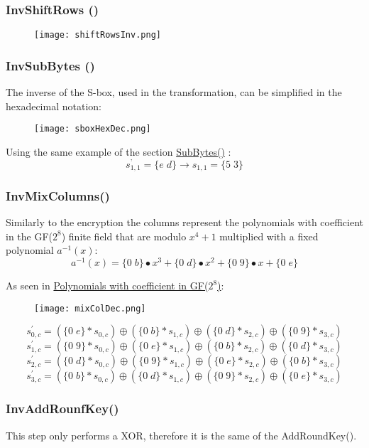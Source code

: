 \documentclass{article}
\begin{document}
\subsubsection{InvShiftRows ()}
\begin{figure}[htb]
	\begin{center}
  		\texttt{[image: shiftRowsInv.png]} 
 	\end{center}
\end{figure}

\subsubsection{InvSubBytes ()}
The inverse of the S-box, used in the transformation, can be simplified in the hexadecimal notation:
\begin{figure}[htb]
	\begin{center}
  		\texttt{[image: sboxHexDec.png]} 
 	\end{center}
\end{figure}
Using the same example of the section \hyperref[sec:sboxEnc]{SubBytes()} :
\[s^{’}_{1,1}=\{e\;d\} \longrightarrow s_{1,1}=\{5\; 3\}\]

\subsubsection{InvMixColumns()}
Similarly to the encryption the columns represent the polynomials with coefficient in the GF($2^8$) finite field that are modulo $x^4+1$ multiplied  with a fixed polynomial $a^{-1}(x)$:
\[a^{-1}(x) = \{0\;b\}•x^3 + \{0\;d\}•x^2+ \{0\;9\}•x + \{0\;e\}\]

As seen in \hyperref[sec:polyGF]{Polynomials with coefficient in GF($2^8$)}:
\begin{figure}[htb]
	\begin{center}
  		\texttt{[image: mixColDec.png]} 
 	\end{center}
\end{figure}

\[s^{'}_{0,c}= (\{0\;e\} * s_{0,c}) \oplus (\{0\;b\} * s_{1,c}) \oplus (\{0\;d\} * s_{2,c})\oplus  (\{0\;9\} * s_{3,c})\]
\[s^{'}_{1,c}= (\{0\;9\} * s_{0,c}) \oplus  (\{0\;e\} * s_{1,c})\oplus (\{0\;b\} * s_{2,c}) \oplus (\{0\;d\} * s_{3,c})\]
\[s^{'}_{2,c}= (\{0\;d\} * s_{0,c}) \oplus (\{0\;9\} * s_{1,c}) \oplus (\{0\;e\} * s_{2,c}) \oplus (\{0\;b\} * s_{3,c})\]
\[s^{'}_{3,c}= (\{0\;b\} * s_{0,c}) \oplus (\{0\;d\} * s_{1,c}) \oplus (\{0\;9\} * s_{2,c}) \oplus (\{0\;e\} * s_{3,c})\]
\subsubsection{InvAddRounfKey()}
This step only performs a XOR, therefore it is the same of the AddRoundKey().



\end{document}
